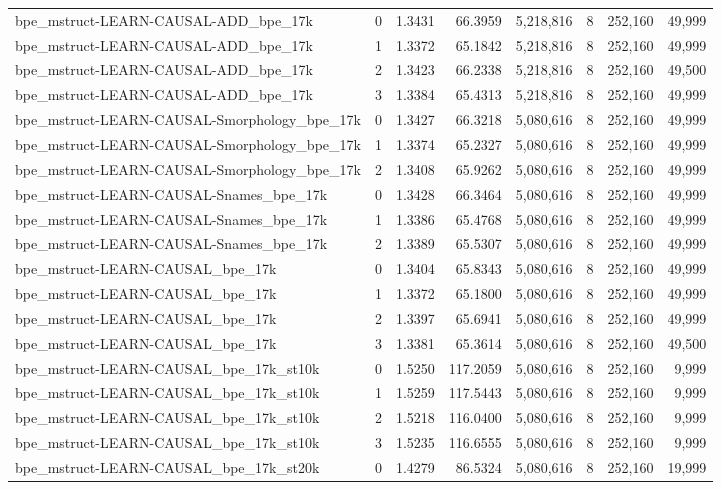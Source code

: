 \begin{tabular}{lrrrrrrr}
bpe\_mstruct-LEARN-CAUSAL-ADD\_bpe\_17k & 0 & 1.3431 & 66.3959 & 5,218,816 & 8 & 252,160 & 49,999 \\
bpe\_mstruct-LEARN-CAUSAL-ADD\_bpe\_17k & 1 & 1.3372 & 65.1842 & 5,218,816 & 8 & 252,160 & 49,999 \\
bpe\_mstruct-LEARN-CAUSAL-ADD\_bpe\_17k & 2 & 1.3423 & 66.2338 & 5,218,816 & 8 & 252,160 & 49,500 \\
bpe\_mstruct-LEARN-CAUSAL-ADD\_bpe\_17k & 3 & 1.3384 & 65.4313 & 5,218,816 & 8 & 252,160 & 49,999 \\
bpe\_mstruct-LEARN-CAUSAL-Smorphology\_bpe\_17k & 0 & 1.3427 & 66.3218 & 5,080,616 & 8 & 252,160 & 49,999 \\
bpe\_mstruct-LEARN-CAUSAL-Smorphology\_bpe\_17k & 1 & 1.3374 & 65.2327 & 5,080,616 & 8 & 252,160 & 49,999 \\
bpe\_mstruct-LEARN-CAUSAL-Smorphology\_bpe\_17k & 2 & 1.3408 & 65.9262 & 5,080,616 & 8 & 252,160 & 49,999 \\
bpe\_mstruct-LEARN-CAUSAL-Snames\_bpe\_17k & 0 & 1.3428 & 66.3464 & 5,080,616 & 8 & 252,160 & 49,999 \\
bpe\_mstruct-LEARN-CAUSAL-Snames\_bpe\_17k & 1 & 1.3386 & 65.4768 & 5,080,616 & 8 & 252,160 & 49,999 \\
bpe\_mstruct-LEARN-CAUSAL-Snames\_bpe\_17k & 2 & 1.3389 & 65.5307 & 5,080,616 & 8 & 252,160 & 49,999 \\
bpe\_mstruct-LEARN-CAUSAL\_bpe\_17k & 0 & 1.3404 & 65.8343 & 5,080,616 & 8 & 252,160 & 49,999 \\
bpe\_mstruct-LEARN-CAUSAL\_bpe\_17k & 1 & 1.3372 & 65.1800 & 5,080,616 & 8 & 252,160 & 49,999 \\
bpe\_mstruct-LEARN-CAUSAL\_bpe\_17k & 2 & 1.3397 & 65.6941 & 5,080,616 & 8 & 252,160 & 49,999 \\
bpe\_mstruct-LEARN-CAUSAL\_bpe\_17k & 3 & 1.3381 & 65.3614 & 5,080,616 & 8 & 252,160 & 49,500 \\
bpe\_mstruct-LEARN-CAUSAL\_bpe\_17k\_st10k & 0 & 1.5250 & 117.2059 & 5,080,616 & 8 & 252,160 & 9,999 \\
bpe\_mstruct-LEARN-CAUSAL\_bpe\_17k\_st10k & 1 & 1.5259 & 117.5443 & 5,080,616 & 8 & 252,160 & 9,999 \\
bpe\_mstruct-LEARN-CAUSAL\_bpe\_17k\_st10k & 2 & 1.5218 & 116.0400 & 5,080,616 & 8 & 252,160 & 9,999 \\
bpe\_mstruct-LEARN-CAUSAL\_bpe\_17k\_st10k & 3 & 1.5235 & 116.6555 & 5,080,616 & 8 & 252,160 & 9,999 \\
bpe\_mstruct-LEARN-CAUSAL\_bpe\_17k\_st20k & 0 & 1.4279 & 86.5324 & 5,080,616 & 8 & 252,160 & 19,999 \\

\end{tabular}
